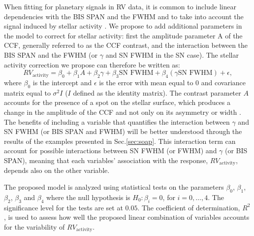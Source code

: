 \documentclass{aa}
\def\logrhk{$\log$(R$^{\prime}_{HK}$)}
\begin{document}
When fitting for planetary signals in RV data, it is common to include linear dependencies with the BIS SPAN and the FWHM and to take into account the signal induced by stellar activity \citep[e.g.][]{Dumusque:2017aa,Feng:2017aa}.
We propose to add additional parameters in the model to correct for stellar activity: first the amplitude parameter A of the CCF, generally referred to as the CCF contrast, and the interaction between the BIS SPAN and the FWHM (or $\gamma$ and SN FWHM in the SN case). The stellar activity correction we propose can therefore be written as:
%
\begin{equation}
RV_{\text{activity}}= \beta_{0} + \beta_{1} A + \beta_{2} \gamma + \beta_{3} \text{SN FWHM} + \beta_{4} (\gamma  \text{SN FWHM})+\epsilon,
\label{eq:RV:correction}
\end{equation}
%
where $\beta_{0}$ is the intercept and $\epsilon$ is the error with mean equal to $0$ and covariance matrix equal to $\sigma^{2}I$ ($I$ defined as the identity matrix). 
The contrast parameter $A$ accounts for the presence of a spot on the stellar surface, which produces a change in the amplitude of the CCF and not only on its asymmetry or width \citep[see e.g. Fig. 2 in ][]{Dumusque-2014b}.
The benefits of including a variable that quantifies the interaction between $\gamma$ and SN FWHM (or BIS SPAN and FWHM) will be better understood through the results of the examples presented in Sec.\ref{sec:soap}. 
This interaction term can account for possible interactions between SN FWHM (or FWHM) and $\gamma$ (or BIS SPAN), meaning that each  variables' association with the response, $RV_{\text{activity}}$, depends also on the other variable.

The proposed model is analyzed using statistical tests on the parameters $\beta_{0}$, $\beta_{1}$, $\beta_{2}$, $\beta_{3}$ and $\beta_{4}$ where the null hypothesis is $H_{0}: \beta_{i}=0$, for $i=0,\dots,4$. The significance level for the tests are set at $0.05$. The coefficient of determination, $R^2$, is used to assess how well the proposed linear combination of variables accounts for the variability of $RV_{\text{activity}}$. 
\end{document}
